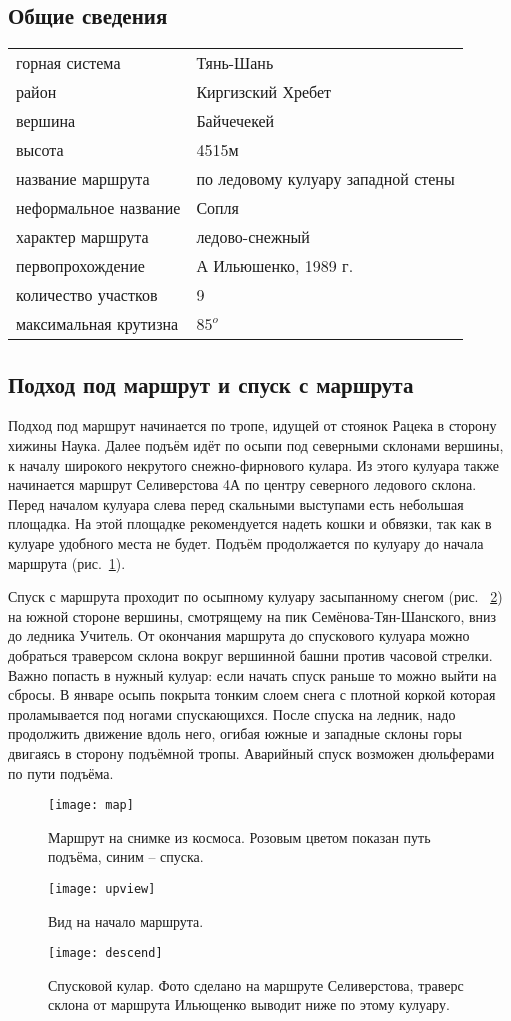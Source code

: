 \documentclass[fleqn, 10pt]{extarticle}
\begin{document}
\subsection{Общие сведения}
		\begin{tabular}{l l}
			горная система & Тянь-Шань \\
			район & Киргизский Хребет \\
			вершина & Байчечекей \\
			высота & 4515м \\
			название маршрута & по ледовому кулуару западной стены \\
			неформальное название & Сопля \\
			характер маршрута & ледово-снежный \\
			первопрохождение & А Ильюшенко, 1989 г. \\
			количество участков & 9 \\
			максимальная крутизна & $85^o$ \\
		\end{tabular}
\subsection{Подход под маршрут и спуск с маршрута}
	Подход под маршрут начинается по тропе, идущей от стоянок Рацека в сторону хижины Наука. Далее подъём идёт по осыпи под северными склонами вершины, к началу широкого некрутого
	снежно-фирнового кулара. Из этого кулуара также начинается маршрут Селиверстова 4А по центру северного ледового склона. Перед началом кулуара слева перед скальными выступами есть небольшая площадка.
	На этой площадке рекомендуется надеть кошки и обвязки, так как в кулуаре удобного места не будет. Подъём продолжается по кулуару до начала маршрута (рис.~\ref{start}).

	Спуск с маршрута проходит по осыпному кулуару засыпанному снегом (рис. ~\ref{descend}) на южной стороне вершины, смотрящему на пик Семёнова-Тян-Шанского, вниз до ледника Учитель.
	От окончания маршрута до спускового кулуара можно
	добраться траверсом склона вокруг вершинной башни против часовой стрелки. Важно попасть в нужный кулуар: если начать спуск раньше то можно выйти на сбросы. В январе осыпь покрыта тонким слоем
	снега с плотной коркой которая проламывается под ногами спускающихся. После спуска на ледник, надо продолжить движение вдоль него, огибая южные и западные
	склоны горы двигаясь в сторону подъёмной тропы. Аварийный спуск возможен дюльферами по пути подъёма.
	\begin{figure}[ht]
		\centering
		\texttt{[image: map]}
		\caption{Маршрут на снимке из космоса. Розовым цветом показан путь подъёма, синим -- спуска.}
	\end{figure}
	\begin{figure}[ht]
		\centering
		\texttt{[image: upview]}
		\caption{Вид на начало маршрута.}\label{start}
	\end{figure}\begin{figure}[ht]
		\centering
		\texttt{[image: descend]}
		\caption{Спусковой кулар. Фото сделано на маршруте Селиверстова, траверс склона от маршрута Ильющенко выводит ниже по этому кулуару.}\label{descend}
	\end{figure}
\FloatBarrier
\end{document}
